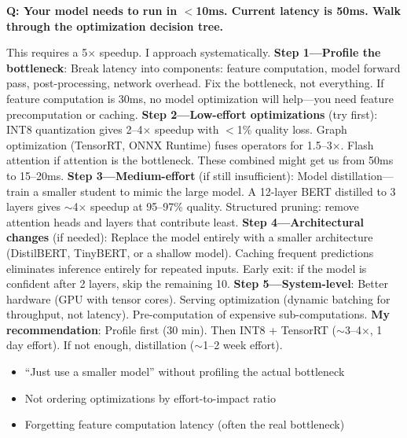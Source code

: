 \begin{interviewq}
\textbf{Q: Your model needs to run in $<$10ms. Current latency is 50ms. Walk through the optimization decision tree.}

 \quad {} \quad \badgefreq{\freqhigh}

\stronganswer This requires a 5$\times$ speedup. I approach systematically. \textbf{Step 1---Profile the bottleneck}: Break latency into components: feature computation, model forward pass, post-processing, network overhead. Fix the bottleneck, not everything. If feature computation is 30ms, no model optimization will help---you need feature precomputation or caching. \textbf{Step 2---Low-effort optimizations} (try first): INT8 quantization gives 2--4$\times$ speedup with $<$1\% quality loss. Graph optimization (TensorRT, ONNX Runtime) fuses operators for 1.5--3$\times$. Flash attention if attention is the bottleneck. These combined might get us from 50ms to 15--20ms. \textbf{Step 3---Medium-effort} (if still insufficient): Model distillation---train a smaller student to mimic the large model. A 12-layer BERT distilled to 3 layers gives $\sim$4$\times$ speedup at 95--97\% quality. Structured pruning: remove attention heads and layers that contribute least. \textbf{Step 4---Architectural changes} (if needed): Replace the model entirely with a smaller architecture (DistilBERT, TinyBERT, or a shallow model). Caching frequent predictions eliminates inference entirely for repeated inputs. Early exit: if the model is confident after 2 layers, skip the remaining 10. \textbf{Step 5---System-level}: Better hardware (GPU with tensor cores). Serving optimization (dynamic batching for throughput, not latency). Pre-computation of expensive sub-computations. \textbf{My recommendation}: Profile first (30 min). Then INT8 + TensorRT ($\sim$3--4$\times$, 1 day effort). If not enough, distillation ($\sim$1--2 week effort).

\redflags
\begin{itemize}
    \item ``Just use a smaller model'' without profiling the actual bottleneck
    \item Not ordering optimizations by effort-to-impact ratio
    \item Forgetting feature computation latency (often the real bottleneck)
\end{itemize}



\end{interviewq}

